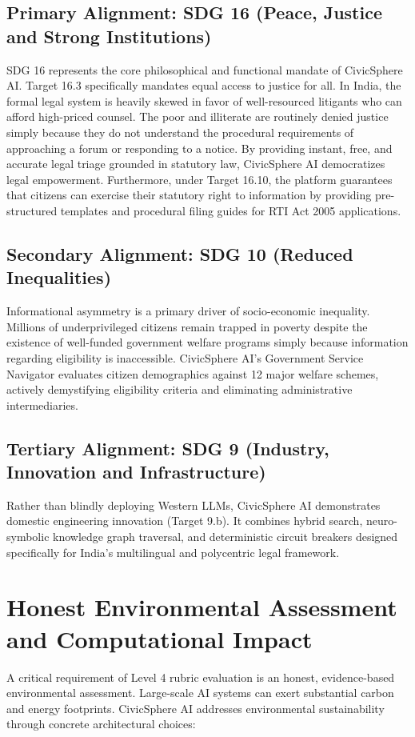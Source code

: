 \subsection{Primary Alignment: SDG 16 (Peace, Justice and Strong Institutions)}
SDG 16 represents the core philosophical and functional mandate of CivicSphere AI. Target 16.3 specifically mandates equal access to justice for all. In India, the formal legal system is heavily skewed in favor of well-resourced litigants who can afford high-priced counsel. The poor and illiterate are routinely denied justice simply because they do not understand the procedural requirements of approaching a forum or responding to a notice. By providing instant, free, and accurate legal triage grounded in statutory law, CivicSphere AI democratizes legal empowerment. Furthermore, under Target 16.10, the platform guarantees that citizens can exercise their statutory right to information by providing pre-structured templates and procedural filing guides for RTI Act 2005 applications.

\subsection{Secondary Alignment: SDG 10 (Reduced Inequalities)}
Informational asymmetry is a primary driver of socio-economic inequality. Millions of underprivileged citizens remain trapped in poverty despite the existence of well-funded government welfare programs simply because information regarding eligibility is inaccessible. CivicSphere AI's Government Service Navigator evaluates citizen demographics against 12 major welfare schemes, actively demystifying eligibility criteria and eliminating administrative intermediaries.

\subsection{Tertiary Alignment: SDG 9 (Industry, Innovation and Infrastructure)}
Rather than blindly deploying Western LLMs, CivicSphere AI demonstrates domestic engineering innovation (Target 9.b). It combines hybrid search, neuro-symbolic knowledge graph traversal, and deterministic circuit breakers designed specifically for India's multilingual and polycentric legal framework.

\section{Honest Environmental Assessment and Computational Impact}
\label{sec:environmental_assessment}
A critical requirement of Level 4 rubric evaluation is an honest, evidence-based environmental assessment. Large-scale AI systems can exert substantial carbon and energy footprints. CivicSphere AI addresses environmental sustainability through concrete architectural choices:

